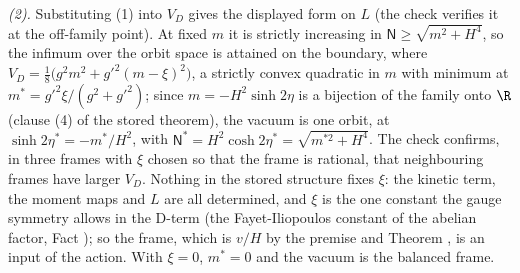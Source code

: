 \emph{(2).} Substituting (1) into $V_{D}$ gives the displayed form on $L$ (the check verifies it at the off-family point). At fixed $m$ it is strictly increasing in $\mathsf{N} \ge \sqrt{m^{2} + H^{4}}$, so the infimum over the orbit space is attained on the boundary, where $V_{D} = \tfrac18\bigl(g^{2}m^{2} + g'^{2}(m - \xi)^{2}\bigr)$, a strictly convex quadratic in $m$ with minimum at $m^{*} = g'^{2}\xi/(g^{2} + g'^{2})$; since $m = -H^{2}\sinh 2\eta$ is a bijection of the family onto $\R$ (clause (4) of the stored theorem), the vacuum is one orbit, at $\sinh 2\eta^{*} = -m^{*}/H^{2}$, with $\mathsf{N}^{*} = H^{2}\cosh 2\eta^{*} = \sqrt{m^{*2} + H^{4}}$. The check confirms, in three frames with $\xi$ chosen so that the frame is rational, that neighbouring frames have larger $V_{D}$. Nothing in the stored structure fixes $\xi$: the kinetic term, the moment maps and $L$ are all determined, and $\xi$ is the one constant the gauge symmetry allows in the D-term (the Fayet-Iliopoulos constant of the abelian factor, Fact ); so the frame, which is $v/H$ by the premise  and Theorem , is an input of the action. With $\xi = 0$, $m^{*} = 0$ and the vacuum is the balanced frame.

